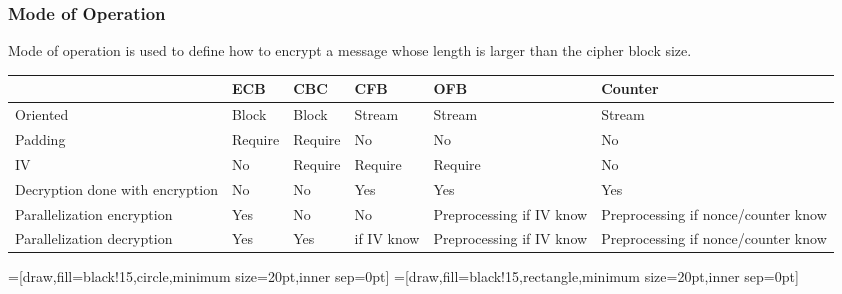 \subsubsection{Mode of Operation} 
Mode of operation is used to define how to encrypt a message whose length
is larger than the cipher block size.

\begin{center}
    \begin{tabular}{|m{2.5cm}|m{1.5cm}|m{1.5cm}|m{1.5cm}|m{2cm}|m{2.5cm}|}
        \hline
        & \textbf{ECB}        & \textbf{CBC}        & \textbf{CFB}    & \textbf{OFB} & \textbf{Counter} \\
        \hline
        Oriented                   & Block      & Block      & Stream & Stream
        & Stream\\
        Padding                    & Require    & Require    & No & No & No\\
        IV                         & No         & Require    & Require &
        Require & No\\
        \hline
        Decryption done with encryption & No & No & Yes & Yes & Yes \\
        \hline
        Parallelization encryption & Yes        & No         & No &
        Preprocessing if IV know & Preprocessing if nonce/counter know\\
        \hline
        Parallelization decryption & Yes        & Yes        & if IV know &
        Preprocessing if IV know & Preprocessing if nonce/counter know\\
        \hline
    \end{tabular}
\end{center}

=[draw,fill=black!15,circle,minimum size=20pt,inner sep=0pt]
=[draw,fill=black!15,rectangle,minimum size=20pt,inner sep=0pt]

